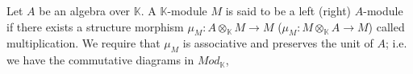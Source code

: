 \documentclass[../thesis.tex]{subfiles}
\begin{document}
            \begin{definition}[Modules]
                Let $A$ be an algebra over $\mathbb{K}$. A $\mathbb{K}$-module $M$ is said to be a left (right) $A$-module if there exists a structure morphism $\mu_M : A\otimes_{\mathbb{K}}M \rightarrow M$ ($\mu_M : M\otimes_{\mathbb{K}}A \rightarrow M$) called multiplication. We require that $\mu_M$ is associative and preserves the unit of $A$; i.e. we have the commutative diagrams in $Mod_\mathbb{K}$,
                \begin{center}
                \end{center}
                        


                        
                        

\end{definition}
\end{document}
